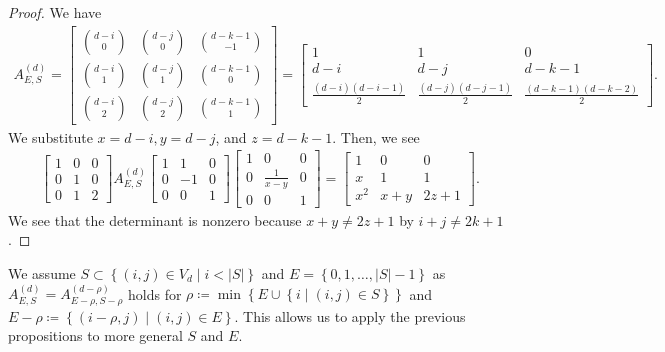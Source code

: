 \begin{proof}
    We have 
    \begin{align*}
        A^{(d)}_{E,S} = \begin{bmatrix}
            \binom{d-i}{0} & \binom{d-j}{0} & \binom{d-k-1}{-1} \\
            \binom{d-i}{1} & \binom{d-j}{1} & \binom{d-k-1}{0} \\
            \binom{d-i}{2} & \binom{d-j}{2} & \binom{d-k-1}{1}
        \end{bmatrix} = \begin{bmatrix}
            1 & 1 & 0 \\
            d-i & d-j & d-k-1 \\
            \frac{(d-i)(d-i-1)}{2} & \frac{(d-j)(d-j-1)}{2} & \frac{(d-k-1)(d-k-2)}{2}
        \end{bmatrix}.
    \end{align*}
    We substitute \( x = d-i, y = d-j \), and \( z = d-k-1 \).
    Then, we see 
    \begin{align*}
        \begin{bmatrix}
            1 & 0 & 0 \\
            0 & 1 & 0 \\
            0 & 1 & 2
        \end{bmatrix}
        A^{(d)}_{E,S} \begin{bmatrix}
            1 & 1 & 0 \\
            0 & -1 & 0 \\
            0 & 0 & 1
        \end{bmatrix}
        \begin{bmatrix}
            1 & 0 & 0 \\
            0 & \frac{1}{x-y} & 0 \\
            0 & 0 & 1
        \end{bmatrix} = 
        \begin{bmatrix}
            1 & 0 & 0 \\
            x & 1 & 1 \\
            x^2 & x+y & 2z+1
        \end{bmatrix}.
    \end{align*}
    We see that the determinant is nonzero because \( x + y \neq 2z + 1 \) by \( i+j \neq 2k+1 \).
\end{proof}

\begin{remark}\label{rem:generality-jfknwejn}
    We assume \(  S \subset \left\{ (i,j) \in V_d \mid i < \lvert S \rvert \right\} \) and \( E = \left\{ 0,1, \dots, \lvert S \rvert - 1 \right\} \)
as \( A^{(d)}_{E,S} = A^{(d-\rho)}_{E - \rho, S - \rho} \) holds for \( \rho \coloneqq \min \left\{ E \cup \left\{ i \mid (i,j) \in S \right\} \right\} \) and \( E - \rho \coloneqq \left\{ (i - \rho, j) \mid (i,j) \in E \right\} \). This allows us to apply the previous propositions to more general \( S \) and \( E \).
\end{remark}

